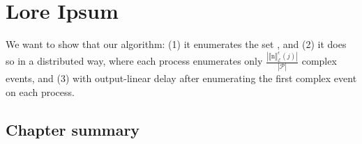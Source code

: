 \chapter{Lore Ipsum}\label{chapter:}




We want to show that our algorithm: (1) it enumerates the set \enumNode, and (2) it does so in a distributed way, where each process enumerates only $\frac{|{\llbracket \text{n} \rrbracket}^{\epsilon}_{\mathcal{E}}(j)|}{|\mathcal{P}|}$ complex events, and (3) with output-linear delay after enumerating the first complex event on each process.

\section{Chapter summary}
